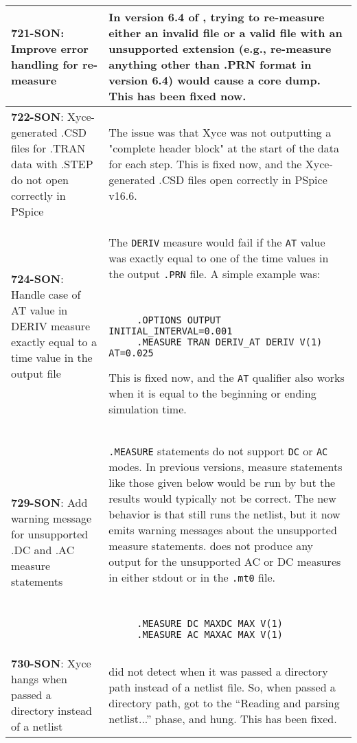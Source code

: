 {\begin{longtable}[h] {>{\raggedright\small}m{2in}|>{\raggedright\let\\\tabularnewline\small}m{3.5in}}
     \textbf{721-SON}: Improve error handling for re-measure & In version 6.4 of \Xyce{}, 
     trying to re-measure either an invalid file or a valid file with an unsupported 
     extension (e.g., re-measure anything other than .PRN format in version 6.4) would 
     cause a core dump.  This has been fixed now.
     \\ \hline

     \textbf{722-SON}: Xyce-generated .CSD files for .TRAN data with .STEP 
     do not open correctly in PSpice & The issue was that Xyce was not 
     outputting a "complete header block" at the start of the data for each 
     step. This is fixed now, and the Xyce-generated .CSD files open correctly in
     PSpice v16.6.
     \\ \hline

     \textbf{724-SON}: Handle case of AT value in DERIV measure exactly equal to 
     a time value in the output file & The \texttt{DERIV} measure would fail if 
     the \texttt{AT} value was exactly equal to one of the time values in the 
     output \texttt{.PRN} file.  A simple example was:  
     {\tt
     \begin{verbatim}
     .OPTIONS OUTPUT INITIAL_INTERVAL=0.001
     .MEASURE TRAN DERIV_AT DERIV V(1) AT=0.025 
     \end{verbatim} 
     }
     This is fixed now, and the \texttt{AT} qualifier also works when it is equal to 
     the beginning or ending simulation time.
     \\ \hline

     \textbf{729-SON}:  Add warning message for unsupported .DC and .AC measure statements & 
     \Xyce{} \texttt{.MEASURE} statements do not support \texttt{DC} or \texttt{AC} modes.
     In previous versions, measure statements like those given below would be run by \Xyce{} 
     but the results would typically not be correct.  The new behavior is that \Xyce{} still 
     runs the netlist, but it now emits warning messages about the unsupported measure statements. 
     \Xyce{} does not produce any output for the unsupported AC or DC measures in either 
     stdout or in the \texttt{.mt0} file.
     {\tt
     \begin{verbatim}
     .MEASURE DC MAXDC MAX V(1)
     .MEASURE AC MAXAC MAX V(1)
     \end{verbatim}
     }
     \\ \hline 

     \textbf{730-SON}: Xyce hangs when passed a directory instead of a netlist &
     \Xyce{} did not detect when it was passed a directory path instead of a netlist file.
     So, when passed a directory path, \Xyce{} got to the ``Reading and parsing netlist...'' 
     phase, and hung.  This has been fixed.
     \\ \hline


\end{longtable}}
